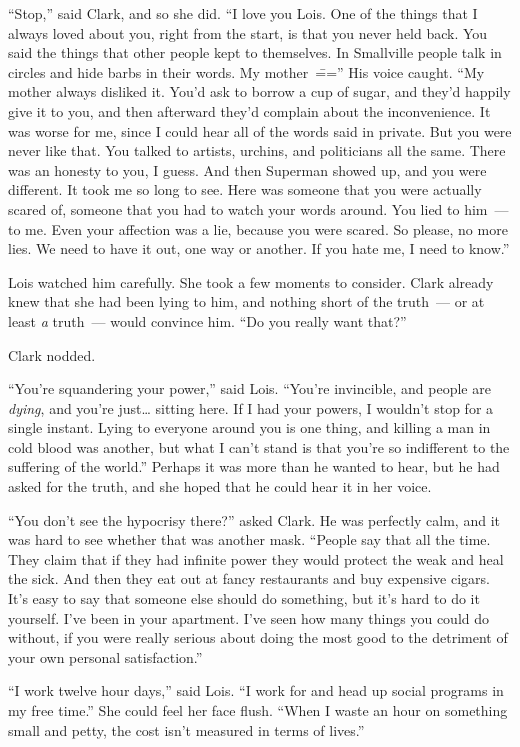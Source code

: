 \documentclass[ebook,12pt]{memoir}
\begin{document}
``Stop,'' said Clark, and so she did. ``I love you Lois. One of the
things that I always loved about you, right from the start, is that you
never held back. You said the things that other people kept to
themselves. In Smallville people talk in circles and hide barbs in their
words. My mother~\==='' His voice caught. ``My mother always disliked it.
You'd ask to borrow a cup of sugar, and they'd happily give it to you,
and then afterward they'd complain about the inconvenience. It was worse
for me, since I could hear all of the words said in private. But you
were never like that. You talked to artists, urchins, and politicians
all the same. There was an honesty to you, I guess. And then Superman
showed up, and you were different. It took me so long to see. Here was
someone that you were actually scared of, someone that you had to watch
your words around. You lied to him~--- to me. Even your affection was a
lie, because you were scared. So please, no more lies. We need to have
it out, one way or another. If you hate me, I need to know.''

Lois watched him carefully. She took a few moments to consider. Clark
already knew that she had been lying to him, and nothing short of the
truth~--- or at least \emph{a} truth~--- would convince him. ``Do you
really want that?''

Clark nodded.

``You're squandering your power,'' said Lois. ``You're invincible, and
people are \emph{dying}, and you're just\ldots{} sitting here. If I had
your powers, I wouldn't stop for a single instant. Lying to everyone
around you is one thing, and killing a man in cold blood was another,
but what I can't stand is that you're so indifferent to the suffering of
the world.'' Perhaps it was more than he wanted to hear, but he had
asked for the truth, and she hoped that he could hear it in her voice.

``You don't see the hypocrisy there?'' asked Clark. He was perfectly
calm, and it was hard to see whether that was another mask. ``People say
that all the time. They claim that if they had infinite power they would
protect the weak and heal the sick. And then they eat out at fancy
restaurants and buy expensive cigars. It's easy to say that someone else
should do something, but it's hard to do it yourself. I've been in your
apartment. I've seen how many things you could do without, if you were
really serious about doing the most good to the detriment of your own
personal satisfaction.''

``I work twelve hour days,'' said Lois. ``I work for and head up social
programs in my free time.'' She could feel her face flush. ``When I
waste an hour on something small and petty, the cost isn't measured in
terms of lives.''
\end{document}
